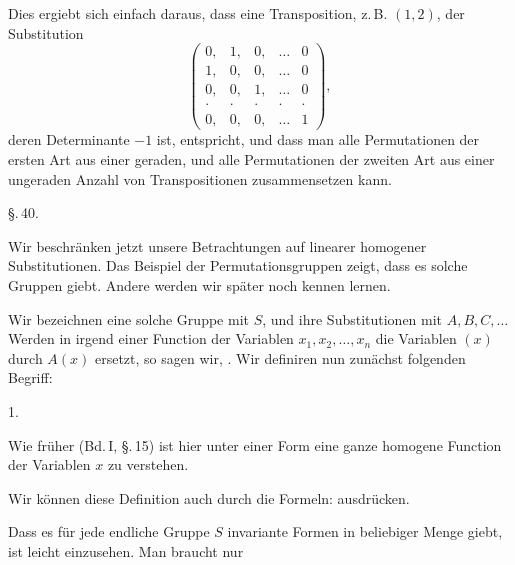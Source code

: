 
Dies ergiebt sich einfach daraus, dass eine Transposition, z.\,B. $(1, 2)$, der Substitution
\[
\begin{pmatrix} 0, & 1, & 0, & \dots & 0 \\ 1, & 0, & 0, & \dots & 0 \\ 0, & 0, & 1, & \dots & 0 \\ \cdot & \cdot & \cdot & \cdot & \cdot \\ 0, & 0, & 0, & \dots & 1 \end{pmatrix},
\]
deren Determinante $-1$ ist, entspricht, und dass man alle Permutationen der ersten Art aus einer geraden, und alle Permutationen der zweiten Art aus einer ungeraden Anzahl von Transpositionen zusammensetzen kann.

\begin{center}
\S.\,40.

\end{center}

Wir beschränken jetzt unsere Betrachtungen auf  linearer homogener Substitutionen. Das Beispiel der Permutationsgruppen zeigt, dass es solche Gruppen giebt. Andere werden wir später noch kennen lernen.

Wir bezeichnen eine solche Gruppe mit $S$, und ihre Substitutionen mit $A, B, C, \dots$ Werden in irgend einer Function der Variablen $x_1, x_2, \dots, x_n$ die Variablen $(x)$ durch $A(x)$ ersetzt, so sagen wir, . Wir definiren nun zunächst folgenden Begriff:

1. 

Wie früher (Bd.\,I, \S.\,15) ist hier unter einer Form eine ganze homogene Function der Variablen $x$ zu verstehen.

Wir können diese Definition auch durch die Formeln:
ausdrücken.

Dass es für jede endliche Gruppe $S$ invariante Formen in beliebiger Menge giebt, ist leicht einzusehen. Man braucht nur
